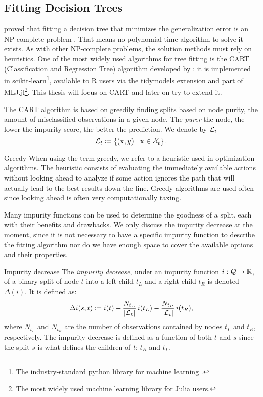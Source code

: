 \subsection{Fitting Decision Trees}
\citeauthor{hyafil1976} proved that fitting a decision tree that minimizes the
generalization error is an NP-complete problem \cite{hyafil1976}. That means no
polynomial time algorithm to solve it exists. As with other NP-complete
problems, the solution methods must rely on heuristics. One of the most widely
used algorithms for tree fitting is the CART (Classification and Regression
Tree) algorithm developed by \citeauthor{breiman2017} \cite{breiman2017}; it is
implemented in scikit-learn\footnote{The industry-standard python library for
machine learning \cite{louppe2014}.}, available to R users via the tidymodels
extension and part of MLJ.jl\footnote{The most widely used machine learning
library for Julia users.}. This thesis will focus on CART and later on try to
extend it.

The CART algorithm is based on greedily finding splits based on node purity, the
amount of misclassified observations in a given node. The \textit{purer} the
node, the lower the impurity score, the better the prediction. We denote by
$\mathcal{L}_t$
\[
    \mathcal{L}_t \coloneqq \left\{ (\mathbf{x}, y) \mid \mathbf{x} \in \mathcal{X}_t \right\}.
\]

\begin{remark}{Greedy}
    When using the term greedy, we refer to a heuristic used in optimization
    algorithms. The heuristic consists of evaluating the immediately available
    actions without looking ahead to analyze if some action ignores the path
    that will actually lead to the best results down the line. Greedy algorithms
    are used often since looking ahead is often very computationally taxing.
\end{remark}

Many impurity functions can be used to determine the goodness of a split, each
with their benefits and drawbacks. We only discuss the impurity decrease at the
moment, since it is not necessary to have a specific impurity function to
describe the fitting algorithm nor do we have enough space to cover the
available options and their properties.

\begin{dfn}{Impurity decrease}{}
    The \emph{impurity decrease}, under an impurity function $i: \mathcal{Q} \to
    \mathbb{R}$, of a binary split of node $t$ into a left child $t_L$ and a right child
    $t_R$ is denoted $\Delta(i)$. It is defined as: 
    \[
        \Delta i(s, t) \coloneqq i(t) - \frac{N_{t_L}}{|\mathcal{L}_t|} \, i(t_L) - \frac{N_{t_R}}{|\mathcal{L}_t|} \, i(t_R),
    \]
    where $N_{t_L}$ and $N_{t_R}$ are the number of observations contained by
    nodes $t_L$ and $t_R$, respectively. The impurity decrease is defined as a
    function of both $t$ and $s$ since the split $s$ is what defines the
    children of $t$: $t_R$ and $t_L$.
\end{dfn}

